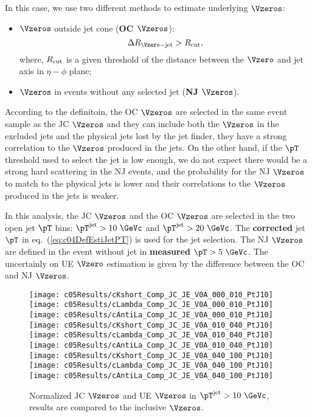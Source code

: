 In this case, we use two different methods to estimate underlying $\Vzeros$:
\begin{itemize}
\item $\Vzeros$ outside jet cone ({\bf OC $\mathbf\Vzeros$}):
      \begin{equation}\label{eq:c05OCV0s}
      \Delta R_{\Vzero-{\rm jet}}>R_{\rm cut},
      \end{equation}
      where, $R_{\rm cut}$ is a given threshold of the distance between the
      $\Vzero$ and jet axis in $\eta-\phi$ plane;
\item $\Vzeros$ in events without any selected jet ({\bf NJ $\mathbf\Vzeros$}).
\end{itemize}

According to the definitoin,
the OC $\Vzeros$ are selected in the same event sample as the JC $\Vzeros$
and they can include both the $\Vzeros$ in the excluded jets and
the physical jets lost by the jet finder,
they have a strong correlation to the $\Vzeros$ produced in the jets.
On the other hand, if the $\pT$ threshold used to select the jet is low enough,
we do not expect there would be a strong hard scattering in the NJ events,
and the probability for the NJ $\Vzeros$ to match to the physical jets
is lower and their correlations to the $\Vzeros$ produced in the jets
is weaker.

In this analysis,
the JC $\Vzeros$ and the OC $\Vzeros$ are selected in the two open
jet $\pT$ bins: $\pT^{\rm jet}>10~\GeVc$ and $\pT^{\rm jet}>20~\GeVc$.
The {\bf corrected} jet $\pT$ in eq.~(\ref{eq:c04DefEstiJetPT}) is used
for the jet selection.
The NJ $\Vzeros$ are defined in the event without jet
in {\bf measured} $\pT>5~\GeVc$.
The uncertainly on UE $\Vzero$ estimation is given by the
difference between the OC and NJ $\Vzeros$.


\begin{figure}[htb]
\begin{center}
\texttt{[image: c05Results/cKshort\_Comp\_JC\_JE\_V0A\_000\_010\_PtJ10]}
\texttt{[image: c05Results/cLambda\_Comp\_JC\_JE\_V0A\_000\_010\_PtJ10]}
\texttt{[image: c05Results/cAntiLa\_Comp\_JC\_JE\_V0A\_000\_010\_PtJ10]}
\texttt{[image: c05Results/cKshort\_Comp\_JC\_JE\_V0A\_010\_040\_PtJ10]}
\texttt{[image: c05Results/cLambda\_Comp\_JC\_JE\_V0A\_010\_040\_PtJ10]}
\texttt{[image: c05Results/cAntiLa\_Comp\_JC\_JE\_V0A\_010\_040\_PtJ10]}
\texttt{[image: c05Results/cKshort\_Comp\_JC\_JE\_V0A\_040\_100\_PtJ10]}
\texttt{[image: c05Results/cLambda\_Comp\_JC\_JE\_V0A\_040\_100\_PtJ10]}
\texttt{[image: c05Results/cAntiLa\_Comp\_JC\_JE\_V0A\_040\_100\_PtJ10]}
\caption{Normalized JC $\Vzeros$ and UE $\Vzeros$ in $\pT^{\rm jet}>10~\GeVc$,
         results are compared to the inclusive $\Vzeros$.}
\label{fig:c05RestulsCompJCPtJ10}
\end{center}
\end{figure}

